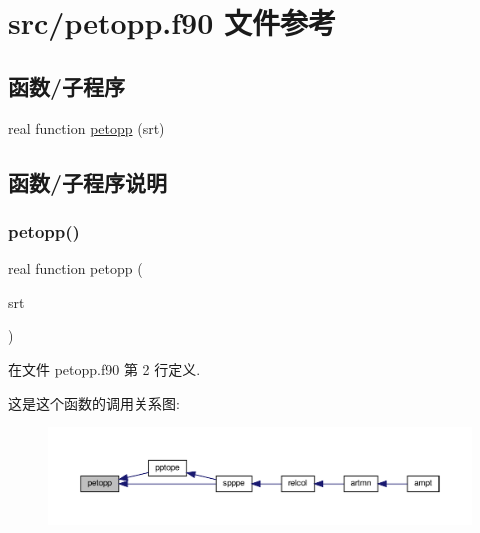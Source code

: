 \hypertarget{petopp_8f90}{}\section{src/petopp.f90 文件参考}
\label{petopp_8f90}
\subsection*{函数/子程序}
\begin{DoxyCompactItemize}
\item 
real function \mbox{\hyperlink{petopp_8f90_a37887910c8a6e05fff37ae9d9be9e4f0}{petopp}} (srt)
\end{DoxyCompactItemize}


\subsection{函数/子程序说明}
\mbox{\label{petopp_8f90_a37887910c8a6e05fff37ae9d9be9e4f0}} 
\subsubsection{\texorpdfstring{petopp()}{petopp()}}
{\footnotesize\ttfamily real function petopp (\begin{DoxyParamCaption}\item[{}]{srt }\end{DoxyParamCaption})}



在文件 petopp.\+f90 第 2 行定义.

这是这个函数的调用关系图\+:
\nopagebreak
\begin{figure}[H]
\begin{center}
\leavevmode
\includegraphics[width=350pt]{petopp_8f90_a37887910c8a6e05fff37ae9d9be9e4f0_icgraph}
\end{center}
\end{figure}
